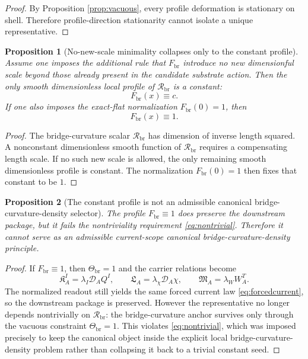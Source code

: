 \documentclass[11pt]{article}
\newcommand{\SpatialD}{\mathcal D}
\newcommand{\CurvSeed}{\Theta_{\mathrm{br}}}
\newcommand{\CurvProfile}{F_{\mathrm{br}}}
\newcommand{\CurvOneI}{\mathfrak K}
\newcommand{\CurvOneChi}{\mathfrak L}
\newcommand{\CurvOneW}{\mathfrak M}
\newcommand{\BridgeCurv}{\mathcal R_{\mathrm{br}}}
\newtheorem{proposition}{Proposition}
\begin{document}
\begin{proof}
By Proposition \ref{prop:vacuous}, every profile deformation is stationary on shell. Therefore profile-direction stationarity cannot isolate a unique representative.
\end{proof}

\begin{proposition}[No-new-scale minimality collapses only to the constant profile]
\label{prop:noscale}
Assume one imposes the additional rule that \(\CurvProfile\) introduce no new dimensionful scale beyond those already present in the candidate substrate action. Then the only smooth dimensionless local profile of \(\BridgeCurv\) is a constant:
\begin{equation}
\CurvProfile(x)\equiv c.
\label{eq:constant}
\end{equation}
If one also imposes the exact-flat normalization \(\CurvProfile(0)=1\), then
\begin{equation}
\CurvProfile(x)\equiv 1.
\label{eq:one}
\end{equation}
\end{proposition}

\begin{proof}
The bridge-curvature scalar \(\BridgeCurv\) has dimension of inverse length squared. A nonconstant dimensionless smooth function of \(\BridgeCurv\) requires a compensating length scale. If no such new scale is allowed, the only remaining smooth dimensionless profile is constant. The normalization \(\CurvProfile(0)=1\) then fixes that constant to be \(1\).
\end{proof}

\begin{proposition}[The constant profile is not an admissible canonical bridge-curvature-density selector]
\label{prop:notadmissible}
The profile \(\CurvProfile\equiv1\) does preserve the downstream package, but it fails the nontriviality requirement \eqref{eq:nontrivial}. Therefore it cannot serve as an admissible current-scope canonical bridge-curvature-density principle.
\end{proposition}

\begin{proof}
If \(\CurvProfile\equiv1\), then \(\CurvSeed=1\) and the carrier relations become
\begin{equation}
\CurvOneI_A^I=\lambda_I\SpatialD_AQ^I,
\qquad
\CurvOneChi_A=\lambda_\chi\SpatialD_A\chi,
\qquad
\CurvOneW_A=\lambda_WW_A^T.
\label{eq:constcarrier}
\end{equation}
The normalized readout still yields the same forced current law \eqref{eq:forcedcurrent}, so the downstream package is preserved. However the representative no longer depends nontrivially on \(\BridgeCurv\): the bridge-curvature anchor survives only through the vacuous constraint \(\CurvSeed=1\). This violates \eqref{eq:nontrivial}, which was imposed precisely to keep the canonical object inside the explicit local bridge-curvature-density problem rather than collapsing it back to a trivial constant seed.
\end{proof}
\end{document}
